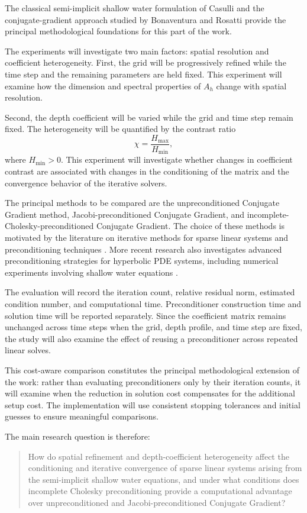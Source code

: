 The classical semi-implicit shallow water formulation of
Casulli \cite{casulli1990} and the conjugate-gradient approach
studied by Bonaventura and Rosatti \cite{bonaventura2002}
provide the principal methodological foundations for this
part of the work.

The experiments will investigate two main factors: spatial
resolution and coefficient heterogeneity. First, the grid will be
progressively refined while the time step and the remaining
parameters are held fixed. This experiment will examine how
the dimension and spectral properties of $A_h$
change with spatial resolution.

Second, the depth coefficient will be varied while the grid and
time step remain fixed. The heterogeneity will be quantified by
the contrast ratio
\begin{equation}
    \chi=\frac{H_{\max}}{H_{\min}},
\end{equation}
where $H_{\min}>0$. This experiment will investigate whether
changes in coefficient contrast are associated with changes
in the conditioning of the matrix and the convergence behavior
of the iterative solvers.

The principal methods to be compared are the unpreconditioned
Conjugate Gradient method, Jacobi-preconditioned Conjugate
Gradient, and incomplete-Cholesky-preconditioned Conjugate
Gradient. The choice of these methods is motivated by the
literature on iterative methods for sparse linear systems and
preconditioning techniques \cite{saad2003,benzi2002}. More
recent research also investigates advanced preconditioning
strategies for hyperbolic PDE systems, including numerical
experiments involving shallow water equations
\cite{krzysik2025}.

The evaluation will record the iteration count, relative residual
norm, estimated condition number, and computational time.
Preconditioner construction time and solution time will be
reported separately. Since the coefficient matrix remains
unchanged across time steps when the grid, depth profile, and
time step are fixed, the study will also examine the effect of
reusing a preconditioner across repeated linear solves.

This cost-aware comparison constitutes the principal
methodological extension of the work: rather than evaluating
preconditioners only by their iteration counts, it will examine
when the reduction in solution cost compensates for the
additional setup cost. The implementation will use consistent
stopping tolerances and initial guesses to ensure meaningful
comparisons.

The main research question is therefore:

\begin{quote}
    How do spatial refinement and depth-coefficient heterogeneity
    affect the conditioning and iterative convergence of sparse
    linear systems arising from the semi-implicit shallow water
    equations, and under what conditions does incomplete Cholesky
    preconditioning provide a computational advantage over
    unpreconditioned and Jacobi-preconditioned Conjugate Gradient?
\end{quote}